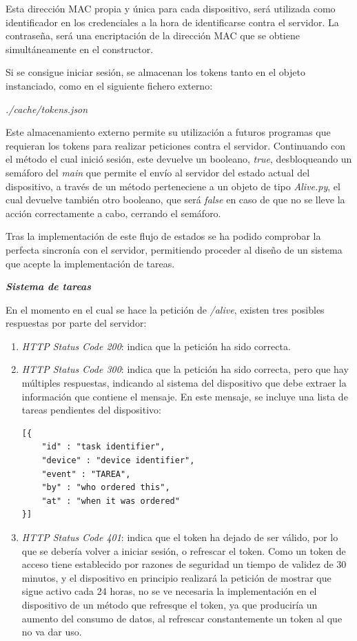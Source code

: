 Esta dirección MAC propia y única para cada dispositivo, será utilizada como identificador en los credenciales a la hora de identificarse contra el servidor.
La contraseña, será una encriptación de la dirección MAC que se obtiene simultáneamente en el constructor.

Si se consigue iniciar sesión, se almacenan los tokens tanto en el objeto instanciado, como en el siguiente fichero externo:
\begin{center}
\textit{./cache/tokens.json}
\end{center}

Este almacenamiento externo permite su utilización a futuros programas que requieran los tokens para realizar peticiones contra el servidor. Continuando con el método el cual inició sesión, este devuelve un booleano, \textit{true}, desbloqueando un semáforo del \textit{main} que permite el envío al servidor del estado actual del dispositivo, a través de un método perteneciene a un objeto de tipo \textit{Alive.py}, el cual devuelve también otro booleano, que será \textit{false} en caso de que no se lleve la acción correctamente a cabo, cerrando el semáforo.

Tras la implementación de este flujo de estados se ha podido comprobar la perfecta sincronía con el servidor, permitiendo proceder al diseño de un sistema que acepte la implementación de tareas.

\textit{\textbf{Sistema de tareas}}

En el momento en el cual se hace la petición de \textit{/alive}, existen tres posibles respuestas por parte del servidor:
\begin{enumerate}
    \item \textit{HTTP Status Code 200}: indica que la petición ha sido correcta.
    \item \textit{HTTP Status Code 300}: indica que la petición ha sido correcta, pero que hay múltiples respuestas, indicando al sistema del dispositivo que debe extraer la información que contiene el mensaje. En este mensaje, se incluye una lista de tareas pendientes del dispositivo:
    
\begin{lstlisting}
[{
    "id" : "task identifier",
    "device" : "device identifier",
    "event" : "TAREA",
    "by" : "who ordered this",
    "at" : "when it was ordered"
}]
\end{lstlisting}


    \item \textit{HTTP Status Code 401}: indica que el token ha dejado de ser válido, por lo que se debería volver a iniciar sesión, o refrescar el token. Como un token de acceso tiene establecido por razones de seguridad un tiempo de validez de 30 minutos, y el dispositivo en principio realizará la petición de mostrar que sigue activo cada 24 horas, no se ve necesaria la implementación en el dispositivo de un método que refresque el token, ya que produciría un aumento del consumo de datos, al refrescar constantemente un token al que no va dar uso.
    
\end{enumerate}


